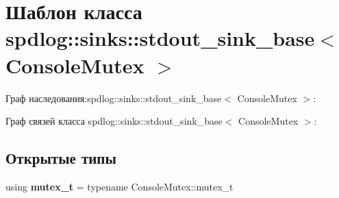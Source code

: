\hypertarget{classspdlog_1_1sinks_1_1stdout__sink__base}{}\section{Шаблон класса spdlog\+:\+:sinks\+:\+:stdout\+\_\+sink\+\_\+base$<$ Console\+Mutex $>$}
\label{classspdlog_1_1sinks_1_1stdout__sink__base}


Граф наследования\+:spdlog\+:\+:sinks\+:\+:stdout\+\_\+sink\+\_\+base$<$ Console\+Mutex $>$\+:


Граф связей класса spdlog\+:\+:sinks\+:\+:stdout\+\_\+sink\+\_\+base$<$ Console\+Mutex $>$\+:
\subsection*{Открытые типы}
\begin{DoxyCompactItemize}
\item 
\mbox{\label{classspdlog_1_1sinks_1_1stdout__sink__base_aef02ee2f4bc9886ef7e42ebc0900c4df}} 
using {\bfseries mutex\+\_\+t} = typename Console\+Mutex\+::mutex\+\_\+t
\end{DoxyCompactItemize}
